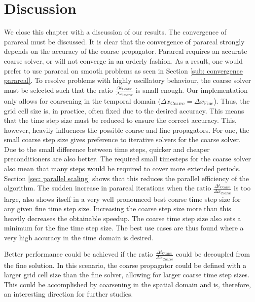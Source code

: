 \section{Discussion}
We close this chapter with a discussion of our results. The convergence of parareal must be discussed. It is clear that the convergence of parareal strongly depends on the accuracy of the coarse propagator. Parareal requires an accurate coarse solver, or will not converge in an orderly fashion. As a result, one would prefer to use parareal on smooth problems as seen in Section \ref{sub: convergence parareal}. To resolve problems with highly oscillatory behaviour, the coarse solver must be selected such that the ratio $\frac{\Delta t_\mathrm{Coarse}}{\Delta x_\mathrm{Coarse}}$ is small enough. Our implementation only allows for coarsening in the temporal domain ($\Delta x_\mathrm{Coarse} = \Delta x_\mathrm{Fine}$). Thus, the grid cell size is, in practice, often fixed due to the desired accuracy. This means that the time step size must be reduced to ensure the correct accuracy. This, however, heavily influences the possible coarse and fine propagators. For one, the small coarse step size gives preference to iterative solvers for the coarse solver. Due to the small difference between time steps, quicker and cheaper preconditioners are also better. The required small timesteps for the coarse solver also mean that many steps would be required to cover more extended periods. Section \ref{sec: parallel scaling} shows that this reduces the parallel efficiency of the algorithm. The sudden increase in parareal iterations when the ratio $\frac{\Delta t_\mathrm{Coarse}}{\Delta x_\mathrm{Coarse}}$ is too large, also shows itself in a very well pronounced best coarse time step size for any given fine time step size. Increasing the coarse step size more than this heavily decreases the obtainable speedup. The coarse time step size also sets a minimum for the fine time step size. The best use cases are thus found where a very high accuracy in the time domain is desired.

Better performance could be achieved if the ratio $\frac{\Delta t_\mathrm{Coarse}}{\Delta x_\mathrm{Coarse}}$ could be decoupled from the fine solution. In this scenario, the coarse propagator could be defined with a larger grid cell size than the fine solver, allowing for larger coarse time step sizes. This could be accomplished by coarsening in the spatial domain and is, therefore, an interesting direction for further studies.


